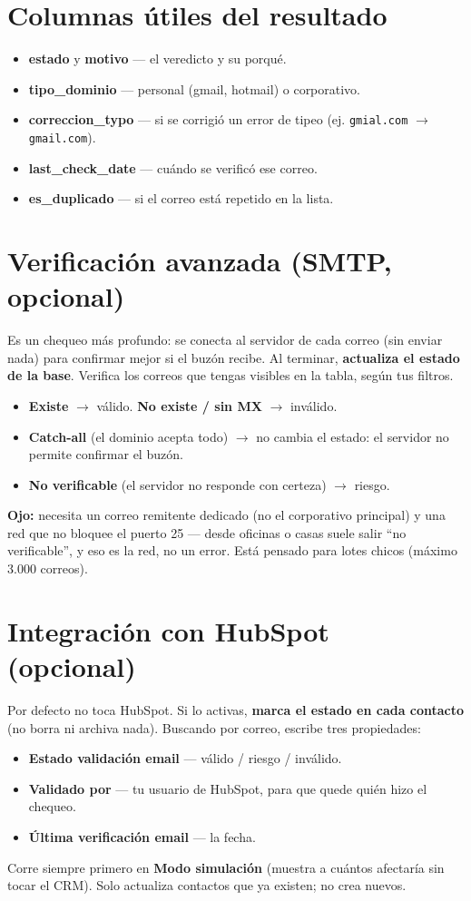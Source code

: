\documentclass[12pt]{article}
\begin{document}
\section{Columnas útiles del resultado}
\begin{itemize}
    \item \textbf{estado} y \textbf{motivo} --- el veredicto y su porqué.
    \item \textbf{tipo\_dominio} --- personal (gmail, hotmail) o corporativo.
    \item \textbf{correccion\_typo} --- si se corrigió un error de tipeo (ej. \texttt{gmial.com}
    $\rightarrow$ \texttt{gmail.com}).
    \item \textbf{last\_check\_date} --- cuándo se verificó ese correo.
    \item \textbf{es\_duplicado} --- si el correo está repetido en la lista.
\end{itemize}

\section{Verificación avanzada (SMTP, opcional)}
Es un chequeo más profundo: se conecta al servidor de cada correo (sin enviar nada) para
confirmar mejor si el buzón recibe. Al terminar, \textbf{actualiza el estado de la base}.
Verifica los correos que tengas visibles en la tabla, según tus filtros.
\begin{itemize}
    \item \textbf{Existe} $\rightarrow$ válido. \quad \textbf{No existe / sin MX}
    $\rightarrow$ inválido.
    \item \textbf{Catch-all} (el dominio acepta todo) $\rightarrow$ no cambia el estado: el
    servidor no permite confirmar el buzón.
    \item \textbf{No verificable} (el servidor no responde con certeza) $\rightarrow$ riesgo.
\end{itemize}
\textbf{Ojo:} necesita un correo remitente dedicado (no el corporativo principal) y una red
que no bloquee el puerto 25 --- desde oficinas o casas suele salir ``no verificable'', y eso
es la red, no un error. Está pensado para lotes chicos (máximo 3.000 correos).

\section{Integración con HubSpot (opcional)}
Por defecto no toca HubSpot. Si lo activas, \textbf{marca el estado en cada contacto} (no
borra ni archiva nada). Buscando por correo, escribe tres propiedades:
\begin{itemize}
    \item \textbf{Estado validación email} --- válido / riesgo / inválido.
    \item \textbf{Validado por} --- tu usuario de HubSpot, para que quede quién hizo el chequeo.
    \item \textbf{Última verificación email} --- la fecha.
\end{itemize}
Corre siempre primero en \textbf{Modo simulación} (muestra a cuántos afectaría sin tocar el
CRM). Solo actualiza contactos que ya existen; no crea nuevos.
\end{document}
